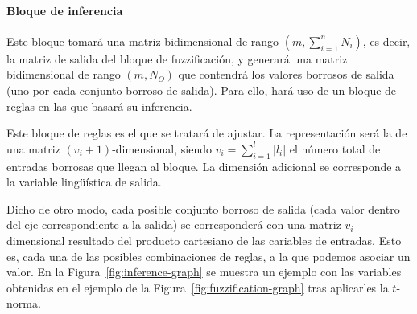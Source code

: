 \paragraph{Bloque de inferencia}

Este bloque tomará una matriz bidimensional de rango $(m, \sum_{i=1}^n N_i)$, es decir, la matriz de salida del bloque de fuzzificación, y generará una matriz bidimensional de rango $(m, N_O)$ que contendrá los valores borrosos de salida (uno por cada conjunto borroso de salida). Para ello, hará uso de un bloque de reglas en las que basará su inferencia.

Este bloque de reglas es el que se tratará de ajustar. La representación será la de una matriz $(v_i + 1)$-dimensional, siendo $v_i = \sum_{i=1}^l \left\vert{l_i}\right\vert$ el número total de entradas borrosas que llegan al bloque. La dimensión adicional se corresponde a la variable lingüística de salida.

Dicho de otro modo, cada posible conjunto borroso de salida (cada valor dentro del eje correspondiente a la salida) se corresponderá con una matriz $v_i$-dimensional resultado del producto cartesiano de las cariables de entradas. Esto es, cada una de las posibles combinaciones de reglas, a la que podemos asociar un valor. En la Figura~\ref{fig:inference-graph} se muestra un ejemplo con las variables obtenidas en el ejemplo de la Figura~\ref{fig:fuzzification-graph} tras aplicarles la $t$-norma.

